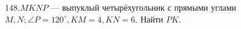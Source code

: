 148.$MKNP$ --- выпуклый четырёхугольник с прямыми углами $M, N; \angle P=120^\circ, KM=4, KN=6.$ Найти $PK.$\\
